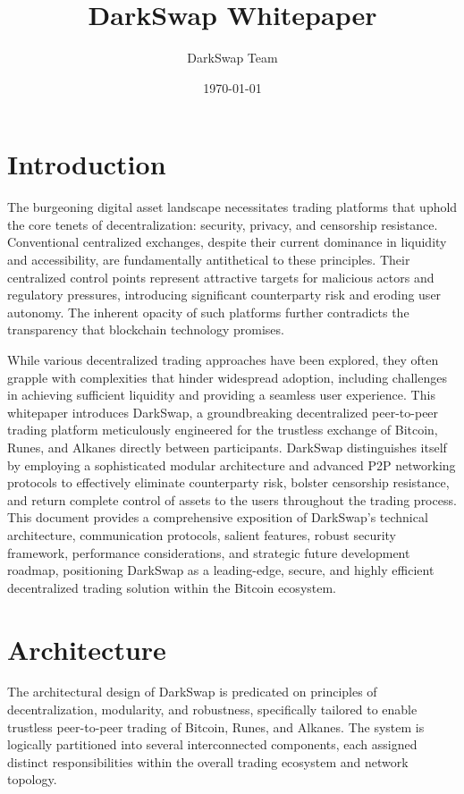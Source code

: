 \documentclass{article}
\title{DarkSwap Whitepaper}
\author{DarkSwap Team}
\date{\today}
\begin{document}
\maketitle

\section{Introduction}
The burgeoning digital asset landscape necessitates trading platforms that uphold the core tenets of decentralization: security, privacy, and censorship resistance. Conventional centralized exchanges, despite their current dominance in liquidity and accessibility, are fundamentally antithetical to these principles. Their centralized control points represent attractive targets for malicious actors and regulatory pressures, introducing significant counterparty risk and eroding user autonomy. The inherent opacity of such platforms further contradicts the transparency that blockchain technology promises.

While various decentralized trading approaches have been explored, they often grapple with complexities that hinder widespread adoption, including challenges in achieving sufficient liquidity and providing a seamless user experience. This whitepaper introduces DarkSwap, a groundbreaking decentralized peer-to-peer trading platform meticulously engineered for the trustless exchange of Bitcoin, Runes, and Alkanes directly between participants. DarkSwap distinguishes itself by employing a sophisticated modular architecture and advanced P2P networking protocols to effectively eliminate counterparty risk, bolster censorship resistance, and return complete control of assets to the users throughout the trading process. This document provides a comprehensive exposition of DarkSwap's technical architecture, communication protocols, salient features, robust security framework, performance considerations, and strategic future development roadmap, positioning DarkSwap as a leading-edge, secure, and highly efficient decentralized trading solution within the Bitcoin ecosystem.

\section{Architecture}
The architectural design of DarkSwap is predicated on principles of decentralization, modularity, and robustness, specifically tailored to enable trustless peer-to-peer trading of Bitcoin, Runes, and Alkanes. The system is logically partitioned into several interconnected components, each assigned distinct responsibilities within the overall trading ecosystem and network topology.
\end{document}
